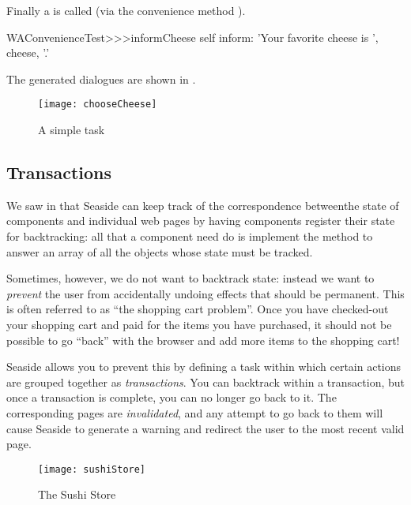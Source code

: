 \documentclass[a4paper,10pt,twoside]{book}
\begin{document}
Finally a  is called (via the convenience method
).

\begin{code}{}
WAConvenienceTest>>>informCheese
	self inform: 'Your favorite cheese is ', cheese, '.'
\end{code}

The generated dialogues are shown in .

\begin{figure}[ht]
\begin{center}
\texttt{[image: chooseCheese]}
\caption{A simple task}
\end{center}
\end{figure}

\subsection{Transactions}

We saw in  that Seaside can keep track of the correspondence betweenthe state of components and individual web pages by having components register their
state for backtracking:
all that a component need do is implement the method  to answer an array of
all the objects whose state must be tracked.

Sometimes, however, we do not want to backtrack state: instead we want to \emph{prevent}
the user from accidentally undoing effects that should be permanent.
This is often referred to as ``the shopping cart problem''.
Once you have checked-out your shopping cart and paid for the items you have purchased,
it should not be possible to go ``back'' with the browser and add more items to the
shopping cart!

Seaside allows you to prevent this by defining a task within which certain actions are
grouped together as \emph{transactions}.
You can backtrack within a transaction, but once a transaction is complete, you can no
longer go back to it.
The corresponding pages are \emph{invalidated}, and any attempt to go back to them will
cause Seaside to generate a warning and redirect the user to the most recent valid page.

\begin{figure}[ht]
\begin{center}
\texttt{[image: sushiStore]}
\caption{The Sushi Store}
\end{center}
\end{figure}
\end{document}

